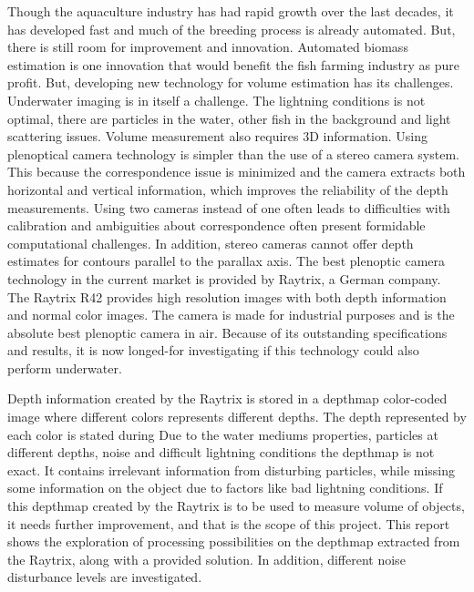 Though the aquaculture industry has had rapid growth over the last decades, it has developed fast and much of the breeding process is already automated. But, there is still room for improvement and innovation. Automated biomass estimation is one innovation that would benefit the fish farming industry as pure profit.
But, developing new technology for volume estimation has its challenges.
Underwater imaging is in itself a challenge. The lightning conditions is not optimal, there are particles in the water, other fish in the background and light scattering issues. Volume measurement also requires 3D information. 
Using plenoptical camera technology is simpler than the use of a stereo camera system. This because the correspondence issue is minimized and the camera extracts both horizontal and vertical information, which improves the reliability of the depth measurements. Using two cameras instead of one often leads to difficulties with calibration and ambiguities about correspondence often present formidable computational challenges. In addition, stereo cameras cannot offer depth estimates for contours parallel to the parallax axis.\cite{article:stereo_vs_plenoptic}
The best plenoptic camera technology in the current market is provided by Raytrix, a German company.\cite{article:plenoptic_camera} The Raytrix R42 provides high resolution images with both depth information and normal color images. The camera is made for industrial purposes and is the absolute best plenoptic camera in air. Because of its outstanding specifications and results, it is now longed-for investigating if this technology could also perform underwater. 

Depth information created by the Raytrix is stored in a depthmap color-coded image where different colors represents different depths. The depth represented by each color is stated during Due to the water mediums properties, particles at different depths, noise and difficult lightning conditions the depthmap is not exact. It contains irrelevant information from disturbing particles, while missing some information on the object due to factors like bad lightning conditions. 
If this depthmap created by the Raytrix is to be used to measure volume of objects, it needs further improvement, and that is the scope of this project. 
This report shows the exploration of processing possibilities on the depthmap extracted from the Raytrix, along with a provided solution. In addition, different noise disturbance levels are investigated.




